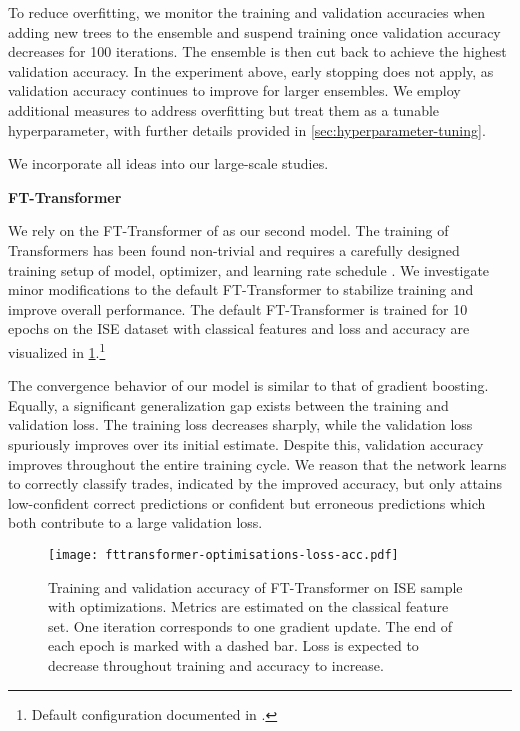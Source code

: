 To reduce overfitting, we monitor the training and validation accuracies when adding new trees to the ensemble and suspend training once validation accuracy decreases for \num{100} iterations. The ensemble is then cut back to achieve the highest validation accuracy. In the experiment above, early stopping does not apply, as validation accuracy continues to improve for larger ensembles. We employ additional measures to address overfitting but treat them as a tunable hyperparameter, with further details provided in \cref{sec:hyperparameter-tuning}.

We incorporate all ideas into our large-scale studies.

\textbf{FT-Transformer}

We rely on the FT-Transformer of \textcite[][18935--18936]{gorishniyRevisitingDeepLearning2021} as our second model. The training of Transformers has been found non-trivial and requires a carefully designed training setup of model, optimizer, and learning rate schedule \autocite[\checkmark][5747]{liuUnderstandingDifficultyTraining2020}. We investigate minor modifications to the default FT-Transformer to stabilize training and improve overall performance. The default FT-Transformer is trained for 10 epochs on the \gls{ISE} dataset with classical features and loss and accuracy are visualized in \cref{fig:fttransformer-optimizations-loss-acc}.\footnote{Default configuration documented in \textcite[\checkmark][18949]{gorishniyRevisitingDeepLearning2021}.}

The convergence behavior of our model is similar to that of gradient boosting. Equally, a significant generalization gap exists between the training and validation loss. The training loss decreases sharply, while the validation loss spuriously improves over its initial estimate. Despite this, validation accuracy improves throughout the entire training cycle. We reason that the network learns to correctly classify trades, indicated by the improved accuracy, but only attains low-confident correct predictions or confident but erroneous predictions which both contribute to a large validation loss.

\begin{figure}[!ht]
    \centering
    \texttt{[image: fttransformer-optimisations-loss-acc.pdf]}
    \caption[Training and Validation Accuracy of FT-Transformer with Optimisations]{Training and validation accuracy of FT-Transformer on \gls{ISE} sample with optimizations. Metrics are estimated on the classical feature set. One iteration corresponds to one gradient update. The end of each epoch is marked with a dashed bar. Loss is expected to decrease throughout training and accuracy to increase.}
    \label{fig:fttransformer-optimizations-loss-acc}
\end{figure}

